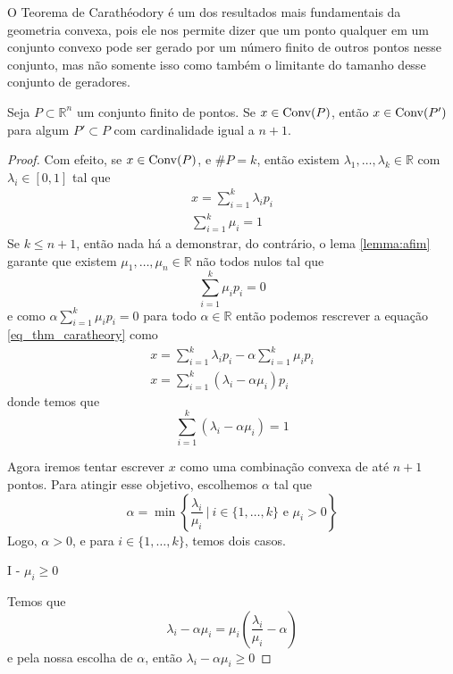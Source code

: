 O Teorema de Carathéodory é um dos resultados mais fundamentais da geometria
convexa, pois ele nos permite dizer que um ponto qualquer em um conjunto
convexo pode ser gerado por um número finito de outros pontos nesse conjunto,
mas não somente isso como também o limitante do tamanho desse conjunto de
geradores.

\begin{thm:caratheodory}[Carathéodory]
	Seja $P \subset \mathbb{R}^n$ um conjunto finito de pontos. Se $x \in \mathrm{Conv}(P)$, então
	$x \in \mathrm{Conv}(P')$ para algum $P' \subset P$ com cardinalidade igual a $n + 1$.

	\begin{proof}
		Com efeito, se $x \in \mathrm{Conv}(P)$, e $\#P = k$, então existem $\lambda_1, \ldots, \lambda_k
		\in \mathbb{R}$ com $\lambda_i \in [0, 1]$ tal que
		\begin{equation}
		\label{eq_thm_caratheory}
		\begin{gathered}
			x = \displaystyle\sum_{i=1}^k \lambda_i p_i \\
			\displaystyle\sum_{i=1}^k \mu_i = 1
		\end{gathered}
		\end{equation}
		Se $k \leq n + 1$, então nada há a demonstrar, do contrário, o lema \ref{lemma:afim}
		garante que existem $\mu_1, \ldots, \mu_n \in \mathbb{R}$ não todos nulos tal que
		\[\displaystyle\sum_{i=1}^k \mu_i p_i = 0\]
		e como \(\alpha \displaystyle\sum_{i=1}^k \mu_i p_i = 0\) para todo $\alpha \in \mathbb{R}$
		então podemos rescrever a equação \ref{eq_thm_caratheory} como
		\begin{gather*}
			x = \displaystyle\sum_{i=1}^k \lambda_i p_i - \alpha \displaystyle\sum_{i=1}^k \mu_i p_i \\
			x = \displaystyle\sum_{i=1}^k (\lambda_i - \alpha \mu_i) p_i
		\end{gather*}
		donde temos que
		\[\displaystyle\sum_{i=1}^k (\lambda_i - \alpha \mu_i) = 1\]

		Agora iremos tentar escrever $x$ como uma combinação convexa de até $n + 1$ pontos.
		Para atingir esse objetivo, escolhemos $\alpha$ tal que
		\[\alpha  = \min\left\{\frac{\lambda_i}{\mu_i}\  |\  i \in \{1,\ldots, k\} \text{ e } \mu_i > 0\right\}\]
		Logo, $\alpha > 0$, e para $i \in \{1, \ldots, k\}$, temos dois casos.

		I - $\mu_i \geq 0$

		Temos que
		\[\lambda_i - \alpha \mu_i = \mu_i \left(\frac{\lambda_i}{\mu_i} - \alpha\right)\]
		e pela nossa escolha de $\alpha$, então \(\lambda_i - \alpha \mu_i \geq 0\)


\end{proof}
\end{thm:caratheodory}
